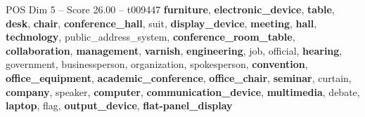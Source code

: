 \begin{textsample}{POS Dim 5 – Score 26.00 – t009447}  \label{ex:f5_pos_035}
\textbf{furniture}, \textbf{electronic\_device}, \textbf{table}, \textbf{desk}, \textbf{chair}, \textbf{conference\_hall}, suit, \textbf{display\_device}, \textbf{meeting}, \textbf{hall}, \textbf{technology}, public\_address\_system, \textbf{conference\_room\_table}, \textbf{collaboration}, \textbf{management}, \textbf{varnish}, \textbf{engineering}, job, official, \textbf{hearing}, government, businessperson, organization, spokesperson, \textbf{convention}, \textbf{office\_equipment}, \textbf{academic\_conference}, \textbf{office\_chair}, \textbf{seminar}, curtain, \textbf{company}, speaker, \textbf{computer}, \textbf{communication\_device}, \textbf{multimedia}, debate, \textbf{laptop}, flag, \textbf{output\_device}, \textbf{flat-panel\_display}

\end{textsample}
